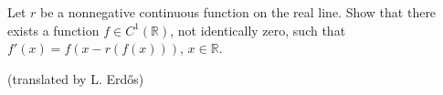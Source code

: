 Let $r$ be a nonnegative continuous function on the real line. Show that there exists a function $f\in C^1(\mathbb{R})$, not identically zero, such that $f'(x)=f(x-r(f(x)))$, $x\in\mathbb{R}$.

(translated by L. Erdős)